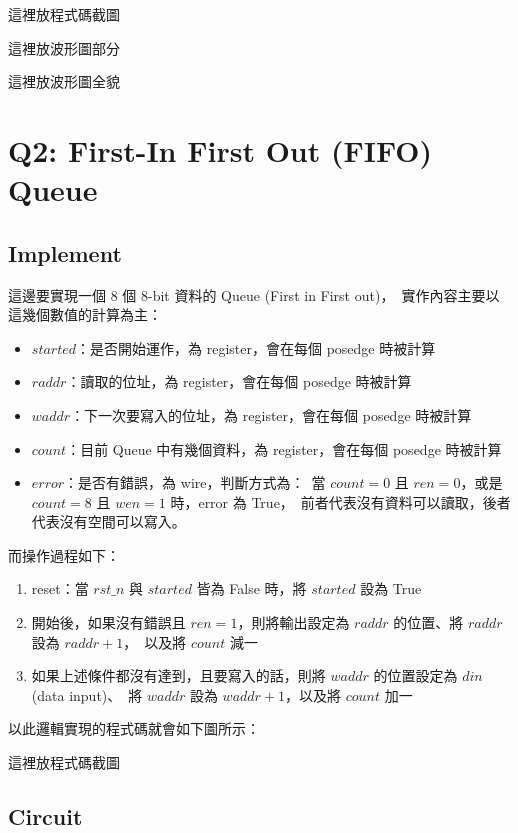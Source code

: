 \documentclass[10.5pt,compsoc,UTF8]{CjC}
\theoremstyle{mystyle}
\begin{document}
這裡放程式碼截圖

這裡放波形圖部分

這裡放波形圖全貌

\section{Q2: First-In First Out (FIFO) Queue}
\label{sec:Q2}

\subsection{Implement}

這邊要實現一個 8 個 8-bit 資料的 Queue (First in First out)，\
實作內容主要以這幾個數值的計算為主：
\begin{itemize}
  \item $started$：是否開始運作，為 register，會在每個 posedge 時被計算
  \item $raddr$：讀取的位址，為 register，會在每個 posedge 時被計算
  \item $waddr$：下一次要寫入的位址，為 register，會在每個 posedge 時被計算
  \item $count$：目前 Queue 中有幾個資料，為 register，會在每個 posedge 時被計算
  \item $error$：是否有錯誤，為 wire，判斷方式為：\
  當 $count = 0$ 且 $ren = 0$，或是 $count = 8$ 且 $wen = 1$ 時，error 為 True，\
  前者代表沒有資料可以讀取，後者代表沒有空間可以寫入。
\end{itemize}

而操作過程如下：
\begin{enumerate}
  \item reset：當 $rst\_n$ 與 $started$ 皆為 False 時，將 $started$ 設為 True
  \item 開始後，如果沒有錯誤且 $ren = 1$，則將輸出設定為 $raddr$ 的位置、將 $raddr$ 設為 $raddr + 1$，\
  以及將 $count$ 減一
  \item 如果上述條件都沒有達到，且要寫入的話，則將 $waddr$ 的位置設定為 $din$ (data input)、\
  將 $waddr$ 設為 $waddr + 1$，以及將 $count$ 加一
\end{enumerate}

以此邏輯實現的程式碼就會如下圖所示：

這裡放程式碼截圖

\subsection{Circuit}
\end{document}
